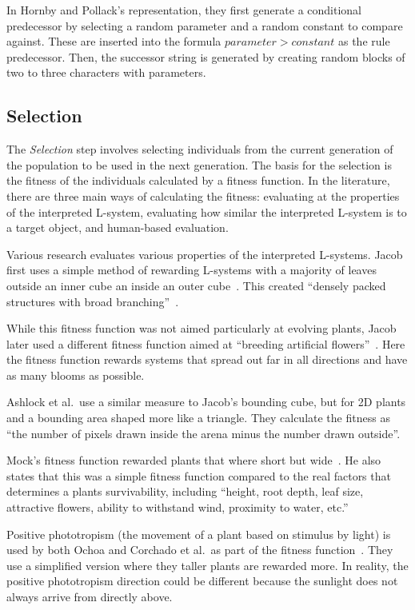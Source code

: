 In Hornby and Pollack's representation, they first generate a conditional predecessor by selecting a random parameter and a random constant to compare against.
These are inserted into the formula $parameter > constant$ as the rule predecessor.
Then, the successor string is generated by creating random blocks of two to three characters with parameters.~\cite{2001Hornby}

\subsection{Selection}
The \textit{Selection} step involves selecting individuals from the current generation of the population to be used in the next generation.
The basis for the selection is the fitness of the individuals calculated by a fitness function.
In the literature, there are three main ways of calculating the fitness: evaluating at the properties of the interpreted \gls{L-system}, evaluating how similar the interpreted \gls{L-system} is to a target object, and human-based evaluation.

Various research evaluates various properties of the interpreted \glspl{L-system}.
Jacob first uses a simple method of rewarding \glspl{L-system} with a majority of leaves outside an inner cube an inside an outer cube~\cite{1994Jacob}.
This created ``densely packed structures with broad branching''~\cite{1994Jacob}.

While this fitness function was not aimed particularly at evolving plants, Jacob later used a different fitness function aimed at ``breeding artificial flowers''~\cite{1994Jacob}.
Here the fitness function rewards systems that spread out far in all directions and have as many blooms as possible.

Ashlock et al.\ use a similar measure to Jacob's bounding cube, but for 2D plants and a bounding area shaped more like a triangle.
They calculate the fitness as ``the number of pixels drawn inside the arena minus the number drawn outside''.
~\cite{2006Ashlock}

Mock's fitness function rewarded plants that where short but wide~\cite{1998Mock}.
He also states that this was a simple fitness function compared to the real factors that determines a plants survivability, including ``height, root depth, leaf size, attractive flowers, ability to withstand wind, proximity to water, etc.''~\cite{1998Mock}

Positive phototropism (the movement of a plant based on stimulus by light) is used by both Ochoa and Corchado et al.\ as part of the fitness function~\cite{1998Ochoa, 2009Corchado}.
They use a simplified version where they taller plants are rewarded more.
In reality, the positive phototropism direction could be different because the sunlight does not always arrive from directly above.

